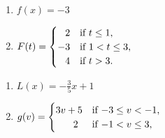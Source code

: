 \documentclass{ximera}
\begin{document}
\begin{enumerate}
\begin{enumerate}
\begin{multicols}{2}
 \end{multicols}

\end{enumerate}


\setcounter{HW}{\value{enumi}}
\end{enumerate}


\begin{multicols}{2}

\begin{enumerate}

\setcounter{enumi}{\value{HW}}

\item $f(x) = -3$  

\item $F(t) = \begin{cases}
  \hphantom{\text{$-$}}2 &  \text{if $t \leq 1$, } \\
  -3  & \text{if $1 < t \leq 3$,} \\
  \hphantom{\text{$-$}}4 & \text{if $t>3$.} \\
 \end{cases}$

\setcounter{HW}{\value{enumi}}

\end{enumerate}

\end{multicols}

\begin{multicols}{2}

\begin{enumerate}

\setcounter{enumi}{\value{HW}}

\item $L(x) = -\frac{3}{5} x + 1$ 

\item $g(v) = \begin{cases}
   3v+5 &  \text{if $-3 \leq v < -1$, } \\
  \hphantom{\text{$3v+$}}2  & \text{if $-1 <  v \leq 3$,} \\
    \end{cases}$

\setcounter{HW}{\value{enumi}}

\end{enumerate}

\end{multicols}
\end{document}

